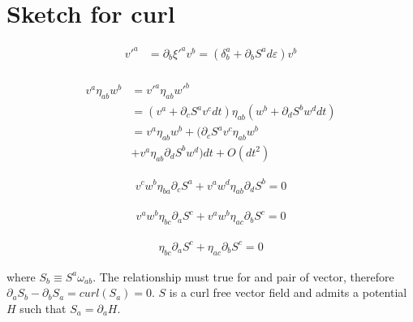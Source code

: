 \documentclass[aps,pra,10pt,twocolumn,floatfix,nofootinbib]{revtex4-1}
\theoremstyle{definition}
\begin{document}
\section{Sketch for curl}

	\begin{align*}
	v'^a &= \partial_b \xi'^a v^b = (\delta^a_b + \partial_b S^a d\varepsilon) v^b \\
	\end{align*}

	\begin{align*}
	v^{a} \eta_{ab} w^{b} &= v'^{a} \eta_{ab} w'^{b}  \\
	&= (v^{a} + \partial_{c} S^{a} v^{c} dt) \eta_{ab} ( w^{b} + \partial_{d} S^{b} w^{d} dt) \\
	&= v^{a} \eta_{ab} w^{b} + (\partial_{c} S^{a} v^{c} \eta_{ab} w^{b} \\
	&+ v^{a} \eta_{ab} \partial_{d} S^{b} w^{d}) dt + O(dt^2)
	\end{align*}
	
	\begin{align*}
	v^{c} w^{b} \eta_{ba} \partial_{c} S^{a} + v^{a} w^{d} \eta_{ab} \partial_{d} S^{b} = 0
	\end{align*}
	
	\begin{align*}
	v^{a} w^{b} \eta_{bc} \partial_{a} S^{c} + v^{a} w^{b} \eta_{ac} \partial_{b} S^{c} = 0
	\end{align*}
	
	\begin{align*}
	\eta_{bc} \partial_{a} S^{c} + \eta_{ac} \partial_{b} S^{c} = 0
	\end{align*}
	
	 where $S_{b} \equiv S^{a} \omega_{ab}$. The relationship must true for and pair of vector, therefore $\partial_{a} S_{b} - \partial_{b} S_{a} = curl(S_{a}) = 0$. $S$ is a curl free vector field and admits a potential $H$ such that $S_{a} = \partial_{a}H$.
\end{document}
